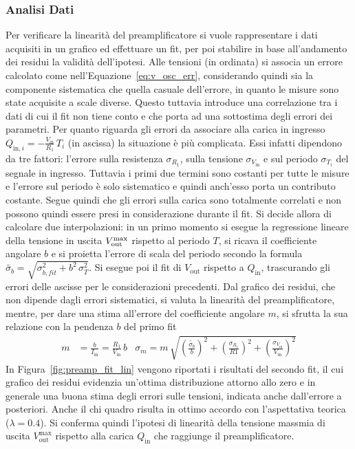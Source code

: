 \subsubsection{Analisi Dati}\label{sec:pream_lin_an}
Per verificare la linearità del preamplificatore si vuole rappresentare i dati
acquisiti in un grafico ed effettuare un fit, per poi stabilire in base
all'andamento dei residui la validità dell'ipotesi. Alle tensioni (in ordinata)
si associa un errore calcolato come nell'Equazione~\ref{eq:v_osc_err}, considerando quindi
sia la componente sistematica che quella casuale dell'errore, in quanto le misure
sono state acquisite a scale diverse. Questo tuttavia introduce una correlazione
tra i dati di cui il fit non tiene conto e che porta ad una sottostima degli
errori dei parametri. Per quanto riguarda gli errori da associare alla carica
in ingresso $Q_{\text{in},i}=-\frac{V_{\text{in}}}{R_{1} }\,T_{i}$ (in ascissa) la situazione è più complicata. Essi infatti dipendono da
tre fattori: l'errore sulla resistenza $\sigma_{R_{1}}$, sulla tensione
$\sigma_{V_{\text{in}}}$ e sul periodo $\sigma_{T_{i}}$ del segnale in ingresso.
Tuttavia i primi due termini sono costanti per tutte le misure e l'errore
sul periodo è solo sistematico e quindi anch'esso porta un contributo costante.
Segue quindi che gli errori sulla carica sono totalmente correlati e non possono
quindi essere presi in considerazione durante il fit. Si decide allora di
calcolare due interpolazioni: in un primo momento si esegue la regressione lineare
della tensione in uscita $V_{\text{out}}^{\text{max}}$ rispetto al periodo $T$, si ricava il coefficiente
angolare $b$ e si proietta l'errore di scala del periodo
secondo la formula
$\widetilde{\sigma_{b}}=\sqrt{ \sigma_{b,fit}^{2}+b^{2}\, \sigma_{T}^{2}}$. Si esegue
poi il fit di $V_{\text{out}}$ rispetto a $Q_{\text{in}}$, trascurando gli errori
delle ascisse per le considerazioni precedenti. Dal grafico dei residui, che non
dipende dagli errori sistematici, si valuta la linearità del preamplificatore, mentre, per dare una stima all'errore del coefficiente angolare $m$, si sfrutta la
sua relazione con la pendenza $b$ del primo fit
\begin{align}
  m&=\frac{b}{I_{\text{in}}}=\frac{R_{1}}{V_{\text{in}}}\, b
  &
    \sigma_{m} = m\,\sqrt{ {\left(\frac{\widetilde{\sigma_{b}}}{b}\right)}^{2}+
    {\left( \frac{\sigma_{R_{1}}}{R1}\right)}^{2} +
    {\left( \frac{\sigma_{V_{\text{in}}}}{V_{\text{in}}} \right)}^{2}}
\end{align}\label{eq:preamp_lin_eq}%
In Figura~\ref{fig:preamp_fit_lin} vengono riportati i risultati del secondo fit, il cui grafico
dei residui evidenzia un'ottima distribuzione attorno allo zero e in generale una
buona stima degli errori sulle tensioni, indicata anche dall'errore a posteriori. Anche il chi quadro risulta in ottimo
accordo con l'aspettativa teorica ($\lambda=0.4$). Si conferma quindi l'ipotesi
di linearità della tensione massmia di uscita $V_{\text{out}}^{\text{max}}$ rispetto alla carica
$Q_{\text{in}}$ che raggiunge il preamplificatore.

